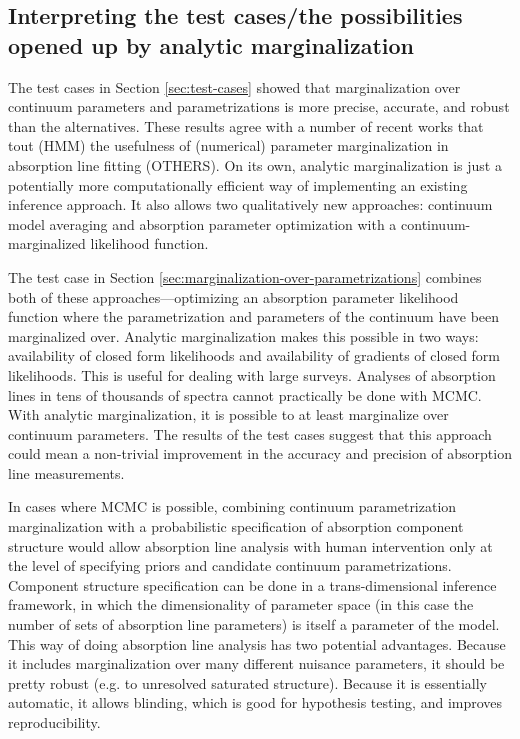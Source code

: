 \documentclass[manuscript]{aastex62}
\begin{document}
\subsection{Interpreting the test cases/the possibilities opened up by analytic marginalization}
The test cases in Section \ref{sec:test-cases} showed that marginalization over continuum parameters and parametrizations is more precise, accurate, and robust than the alternatives.
These results agree with a number of recent works that tout (HMM) the usefulness of (numerical) parameter marginalization in absorption line fitting \citep{2017ApJ...844..136E} (OTHERS).
On its own, analytic marginalization is just a potentially more computationally efficient way of implementing an existing inference approach.
It also allows two qualitatively new approaches: continuum model averaging and absorption parameter optimization with a continuum-marginalized likelihood function.

The test case in Section \ref{sec:marginalization-over-parametrizations} combines both of these approaches---optimizing an absorption parameter likelihood function where the parametrization and parameters of the continuum have been marginalized over.
Analytic marginalization makes this possible in two ways: availability of closed form likelihoods and availability of gradients of closed form likelihoods.
This is useful for dealing with large surveys.
Analyses of absorption lines in tens of thousands of spectra \citep[e.g.]{2013ApJ...770..130Z,Zasowski:2015hi} cannot practically be done with MCMC.
With analytic marginalization, it is possible to at least marginalize over continuum parameters.
The results of the test cases suggest that this approach could mean a non-trivial improvement in the accuracy and precision of absorption line measurements.

In cases where MCMC is possible, combining continuum parametrization marginalization with a probabilistic specification of absorption component structure would allow absorption line analysis with human intervention only at the level of specifying priors and candidate continuum parametrizations.
Component structure specification can be done in a trans-dimensional inference framework, in which the dimensionality of parameter space (in this case the number of sets of absorption line parameters) is itself a parameter of the model.
This way of doing absorption line analysis has two potential advantages.
Because it includes marginalization over many different nuisance parameters, it should be pretty robust (e.g. to unresolved saturated structure).
Because it is essentially automatic, it allows blinding, which is good for hypothesis testing, and improves reproducibility. 
\end{document}
